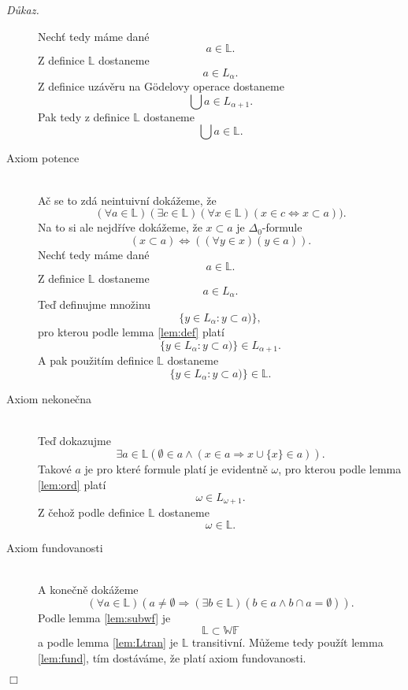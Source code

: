 \documentclass[12pt,a4paper]{article}
\newenvironment{proof}
{\noindent \textit{D\r{u}kaz.}}
{\hspace*{\fill} $\Box$}
\begin{document}
\begin{proof}
\begin{description}
Nech\v{t} tedy m\'{a}me dan\'{e}  \[ a \in  \mathbb{L} .\] Z definice $ \mathbb{L} $ dostaneme \[ a \in L_\alpha .\] Z definice uz\'{a}v\v{e}ru na G\"{o}delovy operace dostaneme \[\bigcup a \in L_{\alpha+1} .\] Pak tedy z definice $ \mathbb{L} $ dostaneme
\[  \bigcup a  \in \mathbb{L} .\]
\item[Axiom potence]~\\
A\v{c} se to zd\'{a} neintuivn\'{i} dok\'{a}\v{z}eme, \v{z}e
\[ (\forall a \in \mathbb{L})(\exists c \in \mathbb{L})(\forall x \in \mathbb{L})(x \in c \Leftrightarrow  x \subset a)) .\]
Na to si ale nejd\v{r}\'{i}ve dok\'{a}\v{z}eme, \v{z}e $  x \subset a $ je  $\Delta_0$-formule 
\[  (x \subset a) \Leftrightarrow ((\forall y \in x)( y\in a)) .\]
Nech\v{t} tedy m\'{a}me dan\'{e} \[ a \in \mathbb{L} .\]
Z definice $ \mathbb{L} $ dostaneme \[ a \in L_\alpha .\]
Te\v{d} definujme mno\v{z}inu \[ \{y \in L_\alpha: y \subset a)\}  ,\] pro kterou podle lemma \ref{lem:def} plat\'{i}
\[ \{y \in L_\alpha: y \subset a) \} \in L_{\alpha+1} .\]
A pak pou\v{z}it\'{i}m definice $ \mathbb{L} $ dostaneme
\[  \{y \in L_\alpha: y \subset a) \}  \in \mathbb{L} .\]
\item[Axiom nekone\v{c}na]~\\
Te\v{d} dokazujme
\[ \exists a \in \mathbb{L} ( \emptyset \in a \wedge (x \in a \Rightarrow x \cup \{x\} \in a)) .\]
Takov\'{e} $ a $ je pro kter\'{e} formule plat\'{i} je evidentn\v{e} $ \omega  $, pro kterou podle lemma \ref{lem:ord} plat\'{i}\[ \omega \in L_{\omega +1} .\]
Z \v{c}eho\v{z} podle definice $ \mathbb{L} $ dostaneme
\[  \omega  \in \mathbb{L} .\]
\item[Axiom fundovanosti]~\\
A kone\v{c}n\v{e} dok\'{a}\v{z}eme
\[ (\forall a \in \mathbb{L})(a \neq \emptyset \Rightarrow (\exists b \in  \mathbb{L})(b \in a \wedge b \cap a = \emptyset)) .\] 
Podle lemma \ref{lem:subwf} je \[ \mathbb{L} \subset \mathbb{WF} \] a podle lemma \ref{lem:Ltran} je $ \mathbb{L}  $ transitivn\'{i}. M\r{u}\v{z}eme tedy pou\v{z}\'{i}t lemma \ref{lem:fund}, t\'{i}m dost\'{a}v\'{a}me, \v{z}e plat\'{i} axiom fundovanosti.
\end{description}
\end{proof}
\end{document}
